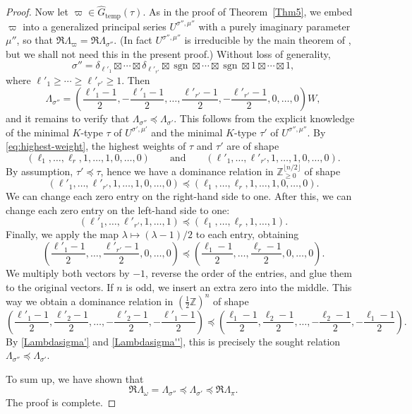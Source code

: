 \documentclass[11pt,oneside]{amsart}
\numberwithin{equation}{section}
\theoremstyle{remark}
\theoremstyle{plain}
\DeclareMathOperator{\sgn}{sgn}
\newcommand\ZZ{\mathbb{Z}}
\renewcommand\geq{\geqslant}
\newcommand\Gtemp{\widehat{G}_\mathrm{temp}}
\begin{document}
\begin{proof}
Now let $\varpi\in\Gtemp(\tau)$. As in the proof of Theorem~\ref{Thm5}, we embed $\varpi$ into a generalized principal series $U^{\sigma'',\mu''}$ with a purely imaginary parameter $\mu''$, so that $\Re\Lambda_\varpi=\Re\Lambda_{\sigma''}$. (In fact $U^{\sigma'',\mu''}$ is irreducible by the main theorem of \cite{Tadic}, but we shall not need this in the present proof.) Without loss of generality,
\[\sigma''=\delta_{\ell'_1}\boxtimes\dotsb\boxtimes\delta_{\ell'_{r'}}\boxtimes\sgn\boxtimes\dotsb\boxtimes\sgn\boxtimes1\boxtimes\dotsb\boxtimes1,\]
where $\ell'_1\geq\dotsb\geq\ell'_{r'}\geq 1$. Then
\begin{equation}\label{Lambdasigma''}
\Lambda_{\sigma''} = \left(\frac{\ell'_1-1}{2},-\frac{\ell'_1-1}{2},\dotsc,\frac{\ell'_{r'}-1}{2},-\frac{\ell'_{r'}-1}{2},
0,\dotsc,0\right)W,
\end{equation}
and it remains to verify that $\Lambda_{\sigma''}\preceq\Lambda_{\sigma'}$. This follows from the explicit knowledge of the minimal $K$-type $\tau$ of $U^{\sigma',\mu'}$ and the minimal $K$-type $\tau'$ of $U^{\sigma'',\mu''}$. By \eqref{eq:highest-weight}, the highest weights of $\tau$ and $\tau'$ are of shape
\[(\ell_1,\dotsc,\ell_r,1,\dotsc,1,0,\dotsc,0)\qquad\text{and}\qquad(\ell'_1,\dotsc,\ell'_{r'},1,\dotsc,1,0,\dotsc,0).\]
By assumption, $\tau'\preceq\tau$, hence we have a dominance relation in $\ZZ_{\geq 0}^{\lfloor n/2\rfloor}$ of shape
\[(\ell'_1,\dotsc,\ell'_{r'},1,\dotsc,1,0,\dotsc,0)\preceq(\ell_1,\dotsc,\ell_r,1,\dotsc,1,0,\dotsc,0).\]
We can change each zero entry on the right-hand side to one. After this, we can change each zero entry on the left-hand side to one:
\[(\ell'_1,\dotsc,\ell'_{r'},1,\dotsc,1)\preceq(\ell_1,\dotsc,\ell_r,1,\dotsc,1).\]
Finally, we apply the map $\lambda\mapsto(\lambda-1)/2$ to each entry, obtaining
\[
\left(\frac{\ell'_1-1}{2},\dotsc,\frac{\ell'_{r'}-1}{2},0,\dotsc,0\right)
\preceq
\left(\frac{\ell_1-1}{2},\dotsc,\frac{\ell_r-1}{2},0,\dotsc,0\right).
\]
We multiply both vectors by $-1$, reverse the order of the entries, and glue them to the original vectors. If $n$ is odd, we insert an extra zero into the middle. This way we obtain a dominance relation in $\left(\frac{1}{2}\ZZ\right)^n$ of shape
\[
\left(\frac{\ell'_1-1}{2},\frac{\ell'_2-1}{2},\dotsc,-\frac{\ell'_2-1}{2},-\frac{\ell'_1-1}{2}\right)
\preceq
\left(\frac{\ell_1-1}{2},\frac{\ell_2-1}{2},\dotsc,-\frac{\ell_2-1}{2},-\frac{\ell_1-1}{2}\right).
\]
By \eqref{Lambdasigma'} and \eqref{Lambdasigma''}, this is precisely the sought relation $\Lambda_{\sigma''}\preceq\Lambda_{\sigma'}$.

To sum up, we have shown that
\[\Re\Lambda_\omega=\Lambda_{\sigma''}\preceq\Lambda_{\sigma'}\preceq\Re\Lambda_{\pi}.\]
The proof is complete.
\end{proof}
\end{document}
